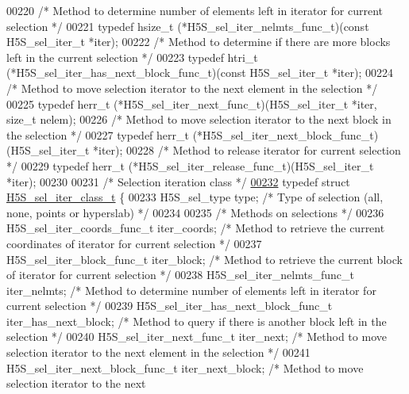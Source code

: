 \begin{DoxyCode}
00220 \textcolor{comment}{/* Method to determine number of elements left in iterator for current selection */}
00221 \textcolor{keyword}{typedef} hsize\_t (*H5S\_sel\_iter\_nelmts\_func\_t)(\textcolor{keyword}{const} H5S\_sel\_iter\_t *iter);
00222 \textcolor{comment}{/* Method to determine if there are more blocks left in the current selection */}
00223 \textcolor{keyword}{typedef} htri\_t (*H5S\_sel\_iter\_has\_next\_block\_func\_t)(\textcolor{keyword}{const} H5S\_sel\_iter\_t *iter);
00224 \textcolor{comment}{/* Method to move selection iterator to the next element in the selection */}
00225 \textcolor{keyword}{typedef} herr\_t (*H5S\_sel\_iter\_next\_func\_t)(H5S\_sel\_iter\_t *iter, \textcolor{keywordtype}{size\_t} nelem);
00226 \textcolor{comment}{/* Method to move selection iterator to the next block in the selection */}
00227 \textcolor{keyword}{typedef} herr\_t (*H5S\_sel\_iter\_next\_block\_func\_t)(H5S\_sel\_iter\_t *iter);
00228 \textcolor{comment}{/* Method to release iterator for current selection */}
00229 \textcolor{keyword}{typedef} herr\_t (*H5S\_sel\_iter\_release\_func\_t)(H5S\_sel\_iter\_t *iter);
00230 
00231 \textcolor{comment}{/* Selection iteration class */}
\hyperlink{struct_h5_s__sel__iter__class__t}{00232} \textcolor{keyword}{typedef} \textcolor{keyword}{struct }\hyperlink{struct_h5_s__sel__iter__class__t}{H5S\_sel\_iter\_class\_t} \{
00233     H5S\_sel\_type type;                          \textcolor{comment}{/* Type of selection (all, none, points or hyperslab) */}
00234 
00235     \textcolor{comment}{/* Methods on selections */}
00236     H5S\_sel\_iter\_coords\_func\_t iter\_coords;     \textcolor{comment}{/* Method to retrieve the current coordinates of iterator
       for current selection */}
00237     H5S\_sel\_iter\_block\_func\_t iter\_block;       \textcolor{comment}{/* Method to retrieve the current block of iterator for
       current selection */}
00238     H5S\_sel\_iter\_nelmts\_func\_t iter\_nelmts;     \textcolor{comment}{/* Method to determine number of elements left in iterator
       for current selection */}
00239     H5S\_sel\_iter\_has\_next\_block\_func\_t iter\_has\_next\_block;         \textcolor{comment}{/* Method to query if there is another
       block left in the selection */}
00240     H5S\_sel\_iter\_next\_func\_t iter\_next;         \textcolor{comment}{/* Method to move selection iterator to the next element in
       the selection */}
00241     H5S\_sel\_iter\_next\_block\_func\_t iter\_next\_block;     \textcolor{comment}{/* Method to move selection iterator to the next
}
\end{DoxyCode}
